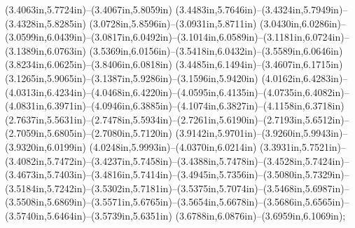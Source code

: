 (3.4063in,5.7724in)--(3.4067in,5.8059in) (3.4483in,5.7646in)--(3.4324in,5.7949in)--(3.4328in,5.8285in) (3.0728in,5.8596in)--(3.0931in,5.8711in) (3.0430in,6.0286in)--(3.0599in,6.0439in)--(3.0817in,6.0492in)--(3.1014in,6.0589in)--(3.1181in,6.0724in)--(3.1389in,6.0763in) (3.5369in,6.0156in)--(3.5418in,6.0432in)--(3.5589in,6.0646in) (3.8234in,6.0625in)--(3.8406in,6.0818in) (3.4485in,6.1494in)--(3.4607in,6.1715in) (3.1265in,5.9065in)--(3.1387in,5.9286in)--(3.1596in,5.9420in) (4.0162in,6.4283in)--(4.0313in,6.4234in)--(4.0468in,6.4220in)--(4.0595in,6.4135in)--(4.0735in,6.4082in)--(4.0831in,6.3971in)--(4.0946in,6.3885in)--(4.1074in,6.3827in)--(4.1158in,6.3718in) (2.7637in,5.5631in)--(2.7478in,5.5934in)--(2.7261in,5.6190in)--(2.7193in,5.6512in)--(2.7059in,5.6805in)--(2.7080in,5.7120in) (3.9142in,5.9701in)--(3.9260in,5.9943in)--(3.9320in,6.0199in) (4.0248in,5.9993in)--(4.0370in,6.0214in) (3.3931in,5.7521in)--(3.4082in,5.7472in)--(3.4237in,5.7458in)--(3.4388in,5.7478in)--(3.4528in,5.7424in)--(3.4673in,5.7403in)--(3.4816in,5.7414in)--(3.4945in,5.7356in)--(3.5080in,5.7329in)--(3.5184in,5.7242in)--(3.5302in,5.7181in)--(3.5375in,5.7074in)--(3.5468in,5.6987in)--(3.5508in,5.6869in)--(3.5571in,5.6765in)--(3.5654in,5.6678in)--(3.5686in,5.6565in)--(3.5740in,5.6464in)--(3.5739in,5.6351in) (3.6788in,6.0876in)--(3.6959in,6.1069in);

